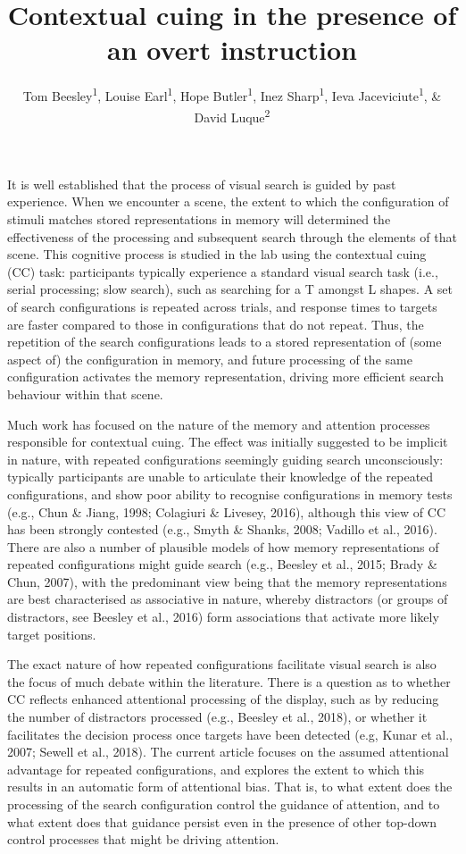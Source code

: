 \documentclass[
  man,floatsintext]{apa7}
\title{Contextual cuing in the presence of an overt instruction}
\author{Tom Beesley\textsuperscript{1}, Louise Earl\textsuperscript{1}, Hope Butler\textsuperscript{1}, Inez Sharp\textsuperscript{1}, Ieva Jaceviciute\textsuperscript{1}, \& David Luque\textsuperscript{2}}
\date{}
\affiliation{\vspace{0.5cm}\textsuperscript{1} Lancaster University, UK\\\textsuperscript{2} Universidad de Málaga, Spain}
\begin{document}
\maketitle

It is well established that the process of visual search is guided by past experience. When we encounter a scene, the extent to which the configuration of stimuli matches stored representations in memory will determined the effectiveness of the processing and subsequent search through the elements of that scene. This cognitive process is studied in the lab using the contextual cuing (CC) task: participants typically experience a standard visual search task (i.e., serial processing; slow search), such as searching for a T amongst L shapes. A set of search configurations is repeated across trials, and response times to targets are faster compared to those in configurations that do not repeat. Thus, the repetition of the search configurations leads to a stored representation of (some aspect of) the configuration in memory, and future processing of the same configuration activates the memory representation, driving more efficient search behaviour within that scene.

Much work has focused on the nature of the memory and attention processes responsible for contextual cuing. The effect was initially suggested to be implicit in nature, with repeated configurations seemingly guiding search unconsciously: typically participants are unable to articulate their knowledge of the repeated configurations, and show poor ability to recognise configurations in memory tests (e.g., Chun \& Jiang, 1998; Colagiuri \& Livesey, 2016), although this view of CC has been strongly contested (e.g., Smyth \& Shanks, 2008; Vadillo et al., 2016). There are also a number of plausible models of how memory representations of repeated configurations might guide search (e.g., Beesley et al., 2015; Brady \& Chun, 2007), with the predominant view being that the memory representations are best characterised as associative in nature, whereby distractors (or groups of distractors, see Beesley et al., 2016) form associations that activate more likely target positions.

The exact nature of how repeated configurations facilitate visual search is also the focus of much debate within the literature. There is a question as to whether CC reflects enhanced attentional processing of the display, such as by reducing the number of distractors processed (e.g., Beesley et al., 2018), or whether it facilitates the decision process once targets have been detected (e.g, Kunar et al., 2007; Sewell et al., 2018). The current article focuses on the assumed attentional advantage for repeated configurations, and explores the extent to which this results in an automatic form of attentional bias. That is, to what extent does the processing of the search configuration control the guidance of attention, and to what extent does that guidance persist even in the presence of other top-down control processes that might be driving attention.
\end{document}
